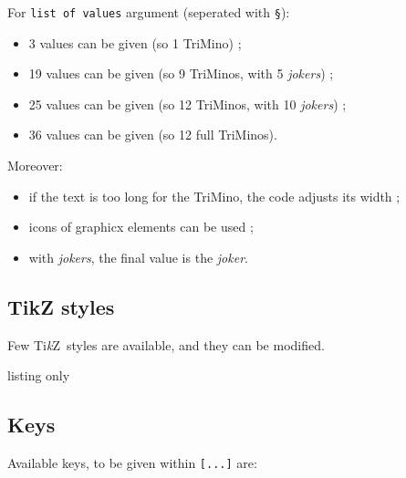 \documentclass[11pt,a4paper]{ltxdoc}
\providecommand\tikzlogo{Ti\textit{k}Z}
\let\TikZ\tikzlogo
\begin{document}
For \texttt{list of values} argument (seperated with \texttt{§}):

\begin{itemize}
	\item 3 values can be given (so 1 \textsf{TriMino}) ;
	\item 19 values can be given (so 9 \textsf{TriMinos}, with 5 \textit{jokers}) ;
	\item 25 values can be given (so 12 \textsf{TriMinos}, with 10 \textit{jokers}) ;
	\item 36 values can be given (so 12 full \textsf{TriMinos}).
\end{itemize}

Moreover:

\begin{itemize}
	\item if the text is too long for the \textsf{TriMino}, the code adjusts its width ;
	\item icons of graphicx elements can be used ;
	\item with \textit{jokers}, the final value is the \textit{joker}.
\end{itemize}

\begin{DemoCode}{}
\end{DemoCode}

\pagebreak

\subsection{TikZ styles}

Few \TikZ\ styles are available, and they can be modified.

\begin{DemoCode}{listing only}


\end{DemoCode}

\subsection{Keys}

Available keys, to be given within \lstinline[language={[latex]TeX},basicstyle=\ttfamily]|[...]| are:
\end{document}
